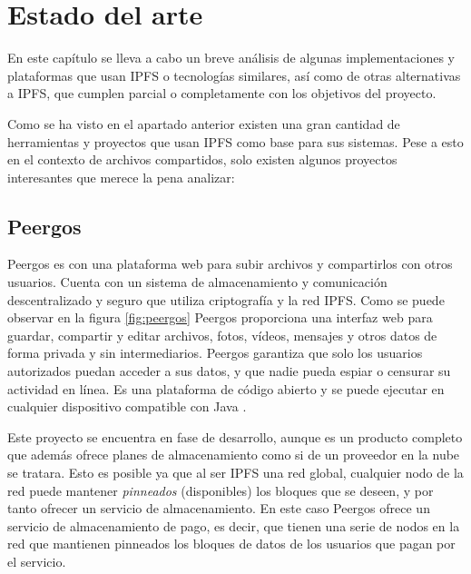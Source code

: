 \chapter{Estado del arte}\label{chap:3estadodelarte}

En este capítulo se lleva a cabo un breve análisis de algunas implementaciones y plataformas que usan IPFS o tecnologías
similares, así como de otras alternativas a IPFS, que cumplen parcial o completamente con los objetivos del proyecto.

Como se ha visto en el apartado anterior existen una gran cantidad de herramientas y proyectos
que usan IPFS como base para sus sistemas. Pese a esto en el contexto de archivos compartidos, solo existen
algunos proyectos interesantes que merece la pena analizar:

\section{Peergos}

Peergos es con una plataforma web para subir archivos y compartirlos con otros usuarios. Cuenta con un sistema de
almacenamiento y comunicación descentralizado y seguro que utiliza criptografía y la red IPFS. Como se puede observar en la
figura \ref{fig:peergos} Peergos proporciona una interfaz web para guardar,
compartir y editar archivos, fotos, vídeos, mensajes y otros datos de forma privada y sin intermediarios. Peergos garantiza que
solo los usuarios autorizados puedan acceder a sus datos, y que nadie pueda espiar o censurar su actividad en línea. Es una
plataforma de código abierto y se puede ejecutar en cualquier dispositivo compatible con Java \cite{PeergosPeergosP2p}.

Este proyecto se encuentra en fase de desarrollo, aunque es un producto completo que además ofrece planes de almacenamiento
como si de un proveedor en la nube se tratara. Esto es posible ya que al ser IPFS una red global,
cualquier nodo de la red puede mantener \textit{pinneados} (disponibles) los bloques que se deseen, y por tanto
ofrecer un servicio de almacenamiento. En este caso Peergos ofrece un servicio de almacenamiento de pago, es decir,
que tienen una serie de nodos en la red que mantienen pinneados los bloques de datos de los usuarios que pagan por el servicio.

